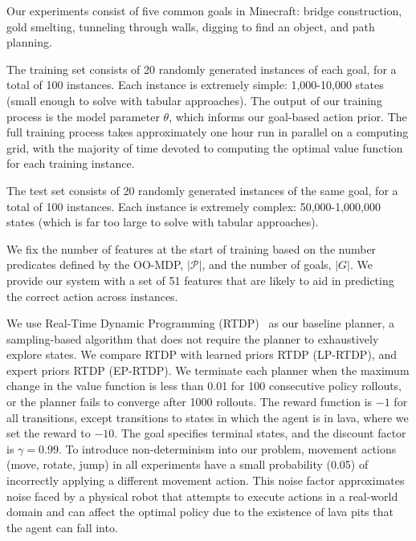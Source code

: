 \documentclass[letterpaper]{article}
\begin{document}
Our experiments consist of five common goals in Minecraft:
bridge construction, gold smelting, tunneling through
walls, digging to find an object, and path planning.

The training set consists of 20 randomly generated instances of each goal, for a total of 100 instances. Each instance is extremely simple: 1,000-10,000 states (small enough to solve with tabular approaches). The output of our training process is the model parameter $\theta$, which informs our goal-based action prior. The full training process takes approximately one hour run in parallel on a computing grid, with the majority of time devoted to computing the optimal value function for each training instance.

The test set consists of 20 randomly generated instances of the same goal, for a total of 100 instances. Each instance is extremely complex: 50,000-1,000,000 states (which is far too large to solve with tabular approaches).




We fix the number of features at the start of training based on the number
predicates defined by the OO-MDP, $|\mathcal{P}|$, and the number of goals, $|G|$.
We provide our system with a set of 51 features that are likely to aid in predicting the correct action across instances.

We use Real-Time Dynamic Programming (RTDP)~\cite{barto95} as our
baseline planner, a sampling-based algorithm that does not require the
planner to exhaustively explore states. We compare RTDP with learned
priors RTDP (LP-RTDP), and expert priors RTDP (EP-RTDP).
We terminate each planner when the maximum change in
the value function is less than 0.01 for 100 consecutive policy
rollouts, or the planner fails to converge after 1000 rollouts.  The
reward function is $-1$ for all transitions, except transitions to
states in which the agent is in lava, where we set the reward to
$-10$. The goal specifies terminal states, and the discount factor is
$\gamma = 0.99$.  To introduce non-determinism into our problem,
movement actions (move, rotate, jump) in all experiments have a small
probability (0.05) of incorrectly applying a different movement
action.  This noise factor approximates noise faced by a physical
robot that attempts to execute actions in a real-world domain and
can affect the optimal policy due to the existence of lava pits
that the agent can fall into. 
\end{document}
